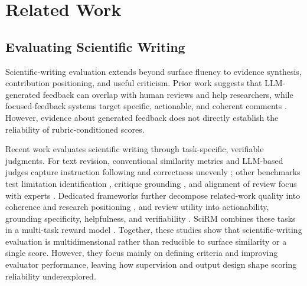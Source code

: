 \section{Related Work}
\label{sec:related-work}


\subsection{Evaluating Scientific Writing}
\label{sec:related-scientific-writing}

Scientific-writing evaluation extends beyond surface fluency to evidence
synthesis, contribution positioning, and useful criticism. Prior work
suggests that LLM-generated feedback can overlap with human reviews and help
researchers, while focused-feedback systems target specific, actionable, and
coherent comments
\citep{liang-etal-2024-large-scale,chamoun-etal-2024-automated}. However,
evidence about generated feedback does not directly establish the reliability
of rubric-conditioned scores.

Recent work evaluates scientific writing through
task-specific, verifiable judgments. For text revision, conventional
similarity metrics and LLM-based judges capture instruction following and
correctness unevenly \citep{jourdan-etal-2025-identifying}; other benchmarks
test limitation identification \citep{xu-etal-2025-llms-identify}, critique
grounding \citep{ou-etal-2025-claimcheck}, and alignment of review focus with
experts \citep{shin-etal-2025-mind}. Dedicated frameworks further decompose
related-work quality into coherence and research positioning
\citep{sahinuc-etal-2025-related-work}, and review utility into actionability,
grounding specificity, helpfulness, and verifiability
\citep{sadallah-etal-2025-good}. SciRM combines these tasks in a multi-task
reward model \citep{sahinuc-etal-2026-reward}. Together, these studies show
that scientific-writing evaluation is multidimensional rather than reducible
to surface similarity or a single score. However, they focus mainly on
defining criteria and improving evaluator performance, leaving how
supervision and output design shape scoring reliability underexplored.

